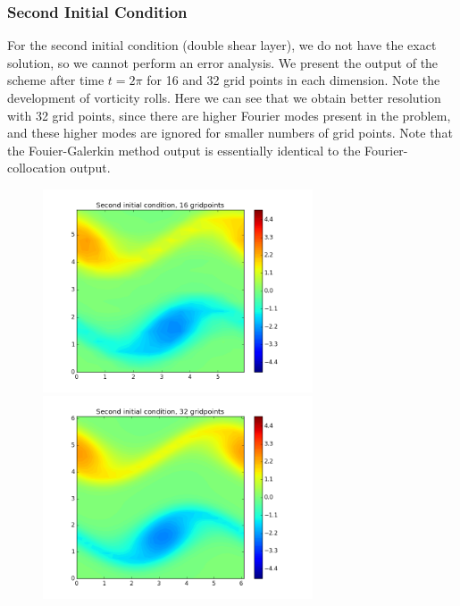\documentclass[12pt]{article}
\begin{document}
\subsubsection*{Second Initial Condition}

For the second initial condition (double shear layer), we do not have the exact solution, so we cannot perform an error analysis. We present the output of the scheme after time $t = 2 \pi$ for 16 and 32 grid points in each dimension. Note the development of vorticity rolls. Here we can see that we obtain better resolution with 32 grid points, since there are higher Fourier modes present in the problem, and these higher modes are ignored for smaller numbers of grid points. Note that the Fouier-Galerkin method output is essentially identical to the Fourier-collocation output.

\begin{figure}[H]
\includegraphics[width=8cm]{images/galerkins16.png}
\includegraphics[width=8cm]{images/galerkins32.png}
\end{figure}
\end{document}
